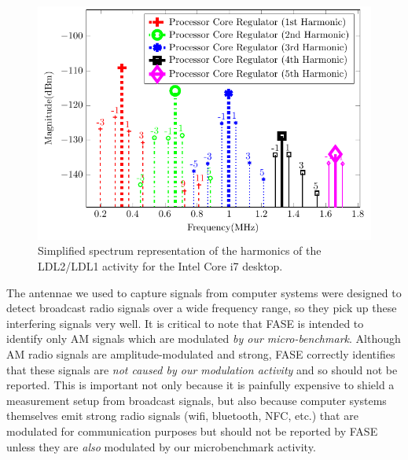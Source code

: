 \begin{figure}[t]
  \centering
    \includegraphics[width=5in]{../fase/Data/core_reg_ldl2_harm.pdf}
  \caption{Simplified spectrum representation of the harmonics of the LDL2/LDL1 activity for the Intel Core i7 desktop.}
  \label{core_reg_ldl2_harm}
\end{figure}

The antennae we used to capture signals from computer systems were designed to detect broadcast radio signals over a wide frequency range, so they pick up these interfering signals very well. It is critical to note that FASE is intended to identify only AM signals which are modulated \textit{by our micro-benchmark}. Although AM radio signals are amplitude-modulated and strong, FASE correctly identifies that these signals are \emph{not caused by our modulation activity} and so should not be reported. This is important not only because it is painfully expensive to shield a measurement setup from broadcast signals, but also because computer systems themselves emit strong radio signals (wifi, bluetooth, NFC, etc.) that are modulated for communication purposes but should not be reported by FASE unless they are \emph{also} modulated by our microbenchmark activity.



